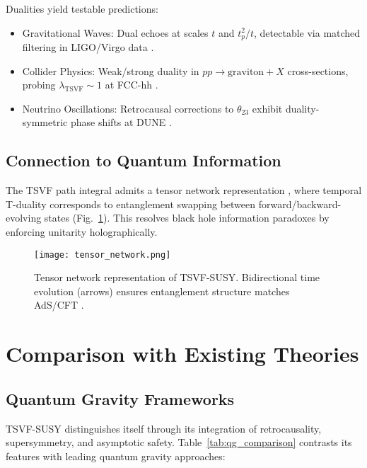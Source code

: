 \documentclass[twocolumn,superscriptaddress,floatfix]{revtex4-2}
\begin{document}
Dualities yield testable predictions:
\begin{itemize}
\item Gravitational Waves: Dual echoes at scales $t$ and $t_p^2/t$, detectable via matched filtering in LIGO/Virgo data \cite{LSC2021}.
\item Collider Physics: Weak/strong duality in $pp \to \text{graviton} + X$ cross-sections, probing $\lambda_{\text{TSVF}} \sim 1$ at FCC-hh \cite{Abada2019}.
\item Neutrino Oscillations: Retrocausal corrections to $\theta_{23}$ exhibit duality-symmetric phase shifts at DUNE \cite{Abi2021}.
\end{itemize}

\subsection{Connection to Quantum Information}  
\label{subsec:quantum_info}  

The TSVF path integral admits a tensor network representation \cite{Swingle2012}, where temporal T-duality corresponds to entanglement swapping between forward/backward-evolving states (Fig.~\ref{fig:tensor_network}). This resolves black hole information paradoxes \cite{Almheiri2020} by enforcing unitarity holographically.  

\begin{figure}[htbp]  
\centering  
\texttt{[image: tensor\_network.png]}  
\caption{Tensor network representation of TSVF-SUSY. Bidirectional time evolution (arrows) ensures entanglement structure matches AdS/CFT \cite{VanRaamsdonk2010}.}  
\label{fig:tensor_network}  
\end{figure}  


\section{Comparison with Existing Theories}
\label{sec:comparison}

\subsection{Quantum Gravity Frameworks}
\label{subsec:qg_comparison}

TSVF-SUSY distinguishes itself through its integration of retrocausality, supersymmetry, and asymptotic safety. Table~\ref{tab:qg_comparison} contrasts its features with leading quantum gravity approaches:
\end{document}
